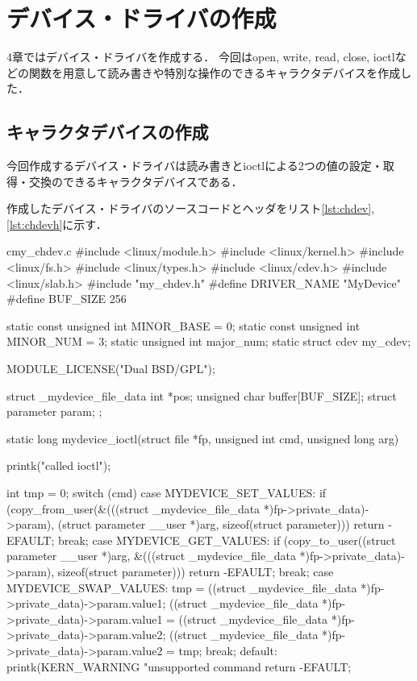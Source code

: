 \chapter{デバイス・ドライバの作成}
4章ではデバイス・ドライバを作成する．
今回はopen, write, read, close, ioctlなどの関数を用意して読み書きや特別な操作のできるキャラクタデバイスを作成した．

\section{キャラクタデバイスの作成}
今回作成するデバイス・ドライバは読み書きとioctlによる2つの値の設定・取得・交換のできるキャラクタデバイスである．

作成したデバイス・ドライバのソースコードとヘッダをリスト\ref{lst:chdev},\ref{lst:chdevh}に示す．
\begin{longlisting}
\begin{myminted}{c}{my\_chdev.c}
#include <linux/module.h>
#include <linux/kernel.h>
#include <linux/fs.h>
#include <linux/types.h>
#include <linux/cdev.h>
#include <linux/slab.h>
#include "my_chdev.h"
#define DRIVER_NAME "MyDevice"
#define BUF_SIZE 256

static const unsigned int MINOR_BASE = 0;
static const unsigned int MINOR_NUM  = 3;
static unsigned int major_num;
static struct cdev my_cdev;

MODULE_LICENSE("Dual BSD/GPL");

struct _mydevice_file_data {
    int *pos;
    unsigned char buffer[BUF_SIZE];
    struct parameter param;
};

static long mydevice_ioctl(struct file *fp, unsigned int cmd, unsigned long arg) {
    printk("called ioctl\n");

    int tmp = 0;
    switch (cmd) {
        case MYDEVICE_SET_VALUES:
            if (copy_from_user(&(((struct _mydevice_file_data *)fp->private_data)->param), (struct parameter __user *)arg, sizeof(struct parameter))) {
                return -EFAULT;
            }
            break;
        case MYDEVICE_GET_VALUES:
            if (copy_to_user((struct parameter __user *)arg, &(((struct _mydevice_file_data *)fp->private_data)->param), sizeof(struct parameter))) {
                return -EFAULT;
            }
            break;
        case MYDEVICE_SWAP_VALUES:
            tmp = ((struct _mydevice_file_data *)fp->private_data)->param.value1;
            ((struct _mydevice_file_data *)fp->private_data)->param.value1 = ((struct _mydevice_file_data *)fp->private_data)->param.value2;
            ((struct _mydevice_file_data *)fp->private_data)->param.value2 = tmp;
            break;
        default:
            printk(KERN_WARNING "unsupported command %
            return -EFAULT;
    }

}
\end{myminted}
\end{longlisting}
